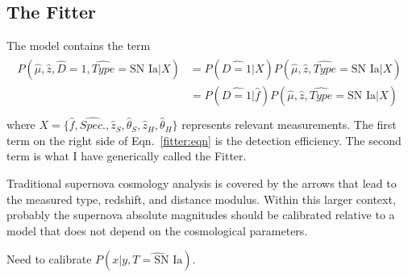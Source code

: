 \documentclass[preprint]{aastex}
\begin{document}
\subsection{The Fitter}
The model contains the term
\begin{align}
\begin{split}
P(\hat{\mu},\hat{z}, \hat{D}=1, \hat{\mathit{Type}}=\text{SN~Ia}|X) & =  P(\hat{D=1}|X) P(\hat{\mu},\hat{z},\hat{\mathit{Type}}=\text{SN~Ia}|X)\\
&=  P(\hat{D=1}|\hat{f}) P(\hat{\mu},\hat{z}, \hat{\mathit{Type}}=\text{SN~Ia}|X)\\
\end{split}
\label{fitter:eqn}
\end{align}
where $X=\{\hat{f}, \hat{\mathit{Spec.}}, \hat{z}_S, \hat{\theta}_S, \hat{z}_H, \hat{\theta}_H\}$
represents relevant measurements.  The first term on the right side of Eqn.~\ref{fitter:eqn}
is the detection efficiency.  The second term is what I have generically called the
Fitter.

Traditional supernova cosmology analysis is covered by the arrows that lead to
the measured type, redshift, and distance modulus.  Within this larger
context, probably the supernova absolute magnitudes should be calibrated relative
to a model that does not depend on the cosmological parameters.

Need to calibrate $P(x|y,\hat{T=\text{SN~Ia}})$.
\end{document}
